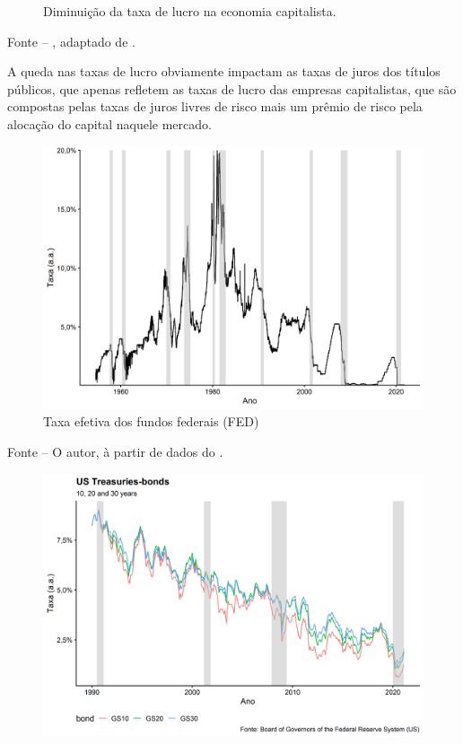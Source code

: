 \documentclass[
	12pt,				%
	oneside,			%
	a4paper,			%
	chapter=TITLE,		%
	section=TITLE,		%
	english,			%
	brazil				%
	]{abntex2}
\newcommand{\bcenter}{\begin{center}}
\newcommand{\ecenter}{\end{center}}
\begin{document}
\begin{refsection}
\begin{figure}[H]
{}

\caption{Diminuição da taxa de lucro na economia capitalista.}\label{fig:roberts}
\end{figure}
\bcenter

\small Fonte -- \textcite{roberts2020}, adaptado de \textcite{crisis}.
\ecenter

A queda nas taxas de lucro obviamente impactam as taxas de juros dos títulos
públicos, que apenas refletem as taxas de lucro das empresas capitalistas, que
são compostas pelas taxas de juros livres de risco mais um prêmio de risco pela
alocação do capital naquele mercado.
\begin{figure}[H]

{\centering \includegraphics[width=0.7\linewidth]{images/effr-1} 

}

\caption{Taxa efetiva dos fundos federais (FED)}\label{fig:effr}
\end{figure}
\bcenter

\small Fonte -- O autor, à partir de dados do \textcite{fredeffr}.
\ecenter
\begin{figure}[H]

{\centering \includegraphics[width=0.7\linewidth]{images/yields-1} 

}


\end{figure}
\end{refsection}
\end{document}
